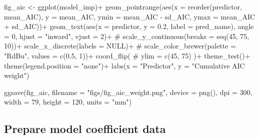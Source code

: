 \documentclass[]{article}
\newenvironment{Shaded}{}{}
\newcommand{\CommentTok}[1]{\textcolor[rgb]{0.00,0.50,0.00}{#1}}
\newcommand{\DataTypeTok}[1]{#1}
\newcommand{\DecValTok}[1]{#1}
\newcommand{\FloatTok}[1]{#1}
\newcommand{\KeywordTok}[1]{\textcolor[rgb]{0.00,0.00,1.00}{#1}}
\newcommand{\NormalTok}[1]{#1}
\newcommand{\OperatorTok}[1]{#1}
\newcommand{\OtherTok}[1]{\textcolor[rgb]{1.00,0.25,0.00}{#1}}
\newcommand{\StringTok}[1]{\textcolor[rgb]{0.00,0.50,0.50}{#1}}
\begin{document}
\begin{Shaded}
\begin{Highlighting}[numbers=left,,]
\NormalTok{fig_aic <-}
\StringTok{  }\KeywordTok{ggplot}\NormalTok{(model_imp)}\OperatorTok{+}
\StringTok{  }\KeywordTok{geom_pointrange}\NormalTok{(}\KeywordTok{aes}\NormalTok{(}\DataTypeTok{x =} \KeywordTok{reorder}\NormalTok{(predictor, mean_AIC),}
                      \DataTypeTok{y =}\NormalTok{ mean_AIC,}
                      \DataTypeTok{ymin =}\NormalTok{ mean_AIC }\OperatorTok{-}\StringTok{ }\NormalTok{sd_AIC,}
                      \DataTypeTok{ymax =}\NormalTok{ mean_AIC }\OperatorTok{+}\StringTok{ }\NormalTok{sd_AIC))}\OperatorTok{+}
\StringTok{  }\KeywordTok{geom_text}\NormalTok{(}\KeywordTok{aes}\NormalTok{(}\DataTypeTok{x =}\NormalTok{ predictor, }
                \DataTypeTok{y =} \FloatTok{0.2}\NormalTok{,}
                \DataTypeTok{label =}\NormalTok{ pred_name),}
            \DataTypeTok{angle =} \DecValTok{0}\NormalTok{,}
            \DataTypeTok{hjust =} \StringTok{"inward"}\NormalTok{,}
            \DataTypeTok{vjust =} \DecValTok{2}\NormalTok{)}\OperatorTok{+}
\StringTok{  }\CommentTok{# scale_y_continuous(breaks = seq(45, 75, 10))+}
\StringTok{  }\KeywordTok{scale_x_discrete}\NormalTok{(}\DataTypeTok{labels =} \OtherTok{NULL}\NormalTok{)}\OperatorTok{+}
\StringTok{  }\CommentTok{# scale_color_brewer(palette = "RdBu", values = c(0.5, 1))+}
\StringTok{  }\KeywordTok{coord_flip}\NormalTok{(}
    \CommentTok{# ylim = c(45, 75)}
\NormalTok{  )}\OperatorTok{+}
\StringTok{  }\KeywordTok{theme_test}\NormalTok{()}\OperatorTok{+}
\StringTok{  }\KeywordTok{theme}\NormalTok{(}\DataTypeTok{legend.position =} \StringTok{"none"}\NormalTok{)}\OperatorTok{+}
\StringTok{  }\KeywordTok{labs}\NormalTok{(}\DataTypeTok{x =} \StringTok{"Predictor"}\NormalTok{,}
       \DataTypeTok{y =} \StringTok{"Cumulative AIC weight"}\NormalTok{)}

\KeywordTok{ggsave}\NormalTok{(fig_aic,}
       \DataTypeTok{filename =} \StringTok{"figs/fig_aic_weight.png"}\NormalTok{, }
       \DataTypeTok{device =} \KeywordTok{png}\NormalTok{(),}
       \DataTypeTok{dpi =} \DecValTok{300}\NormalTok{,}
       \DataTypeTok{width =} \DecValTok{79}\NormalTok{, }\DataTypeTok{height =} \DecValTok{120}\NormalTok{, }\DataTypeTok{units =} \StringTok{"mm"}\NormalTok{)}
\end{Highlighting}
\end{Shaded}

\hypertarget{prepare-model-coefficient-data}{%
\subsection{Prepare model coefficient data}\label{prepare-model-coefficient-data}}
\end{document}
